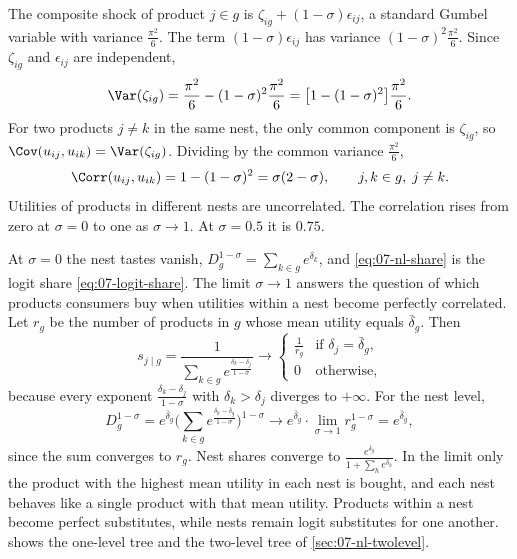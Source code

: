 The composite shock of product $j \in g$ is $\zeta_{ig} + (1-\sigma)\epsilon_{ij}$, a standard Gumbel variable
with variance $\frac{\pi^2}{6}$. The term $(1-\sigma)\epsilon_{ij}$ has variance $(1-\sigma)^2\frac{\pi^2}{6}$.
Since $\zeta_{ig}$ and $\epsilon_{ij}$ are independent,
\begin{equation*}
\Var(\zeta_{ig}) = \frac{\pi^2}{6} - (1-\sigma)^2\frac{\pi^2}{6} = \big[1 - (1-\sigma)^2\big]\frac{\pi^2}{6} .
\end{equation*}
For two products $j \neq k$ in the same nest, the only common component is $\zeta_{ig}$, so
$\Cov(u_{ij}, u_{ik}) = \Var(\zeta_{ig})$. Dividing by the common variance $\frac{\pi^2}{6}$,
\begin{equation}\label{eq:07-nl-corr}
\Corr(u_{ij}, u_{ik}) = 1 - (1-\sigma)^2 = \sigma(2 - \sigma), \qquad j, k \in g, \; j \neq k .
\end{equation}
Utilities of products in different nests are uncorrelated. The correlation rises from zero at $\sigma = 0$ to one as
$\sigma \to 1$. At $\sigma = 0.5$ it is $0.75$.

At $\sigma = 0$ the nest tastes vanish, $D_g^{1-\sigma} = \sum_{k \in g}e^{\delta_k}$, and \eqref{eq:07-nl-share}
is the logit share \eqref{eq:07-logit-share}. The limit $\sigma \to 1$ answers the question of which products
consumers buy when utilities within a nest become perfectly correlated. Let $r_g$ be the number of products in
$g$ whose mean utility equals $\bar\delta_g$. Then
\begin{equation*}
s_{j \mid g} = \frac{1}{\sum_{k \in g}e^{\frac{\delta_k - \delta_j}{1-\sigma}}} \longrightarrow
\begin{cases}
\frac{1}{r_g} & \text{if } \delta_j = \bar\delta_g, \\
0 & \text{otherwise},
\end{cases}
\end{equation*}
because every exponent $\frac{\delta_k - \delta_j}{1 - \sigma}$ with $\delta_k > \delta_j$ diverges to $+\infty$. For the nest
level,
\begin{equation*}
D_g^{1-\sigma} = e^{\bar\delta_g}\Big(\sum_{k\in g}e^{\frac{\delta_k - \bar\delta_g}{1-\sigma}}\Big)^{1-\sigma}
\longrightarrow e^{\bar\delta_g}\cdot\lim_{\sigma\to 1} r_g^{1-\sigma} = e^{\bar\delta_g} ,
\end{equation*}
since the sum converges to $r_g$. Nest shares converge to $\frac{e^{\bar\delta_g}}{1 + \sum_h e^{\bar\delta_h}}$.
In the limit only the product with the highest mean utility in each nest is bought, and each nest behaves like a
single product with that mean utility. Products within a nest become perfect substitutes, while nests remain logit
substitutes for one another.  shows the one-level tree and the two-level tree of
\cref{sec:07-nl-twolevel}.

